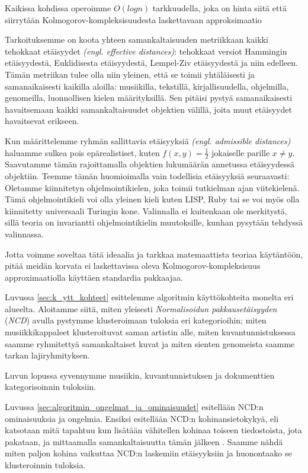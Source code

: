 \documentclass[12pt,finnish,draft]{tktltiki2}
\theoremstyle{definition}
\theoremstyle{remark}
\newcommand{\engl}[1]{\emph{(engl. #1)}}
\begin{document}
  Kaikissa kohdissa  operoimme $O(log n)$ tarkkuudella, joka on hinta siitä että siirrytään Kolmogorov-kompleksisuudesta laskettavaan approksimaatio

  Tarkoituksemme on koota yhteen samankaltaisuuden metriikkaan kaikki tehokkaat etäisyydet \engl{effective distances}: tehokkaat versiot Hammingin etäisyydestä, Euklidisesta etäisyydestä, Lempel-Ziv etäisyydestä ja niin edelleen.
  Tämän metriikan tulee olla niin yleinen, että se toimii yhtäläisesti ja samanaikaisesti kaikilla aloilla: musiikilla, tekstillä, kirjallisuudella, ohjelmilla, genomeilla, luonnollisen kielen määrityksillä.
  Sen pitäisi pystyä samanaikaisesti havaitsemaan kaikki samankaltaisuudet objektien välillä, joita muut etäisyydet havaitsevat erikseen.

  Kun määrittelemme ryhmän sallittavia etäisyyksiä \engl{admissible distances} haluamme sulkea pois epärealistiset, kuten $f(x,y) = \frac{1}{2}$ jokaiselle parille $x \neq y$.
  Saavutamme tämän rajoittamalla objektien lukumäärän annetussa etäisyydessä objektiin.
  Teemme tämän huomioimalla vain todellisia etäisyyksiä seuraavasti: Oletamme kiinnitetyn ohjelmointikielen, joka toimii tutkielman ajan viitekielenä.
  Tämä ohjelmointikieli voi olla yleinen kieli kuten LISP, Ruby tai se voi myös olla kiinnitetty universaali Turingin kone. \cite{CV05,cilibrasi2007google}
  Valinnalla ei kuitenkaan ole merkitystä, sillä teoria on invariantti ohjelmointikielin muutoksille, kunhan pysytään tehdyssä valinnassa.


Jotta voimme soveltaa tätä ideaalia ja tarkkaa matemaattista teoriaa käytäntöön, pitää meidän korvata ei laskettavissa oleva Kolmogorov-kompleksisuus approximaatiolla käyttäen standardia pakkaajaa.

\label{par:intro-3}
  Luvussa \ref{sec:k_ytt_kohteet} esittelemme algoritmin käyttökohteita monelta eri alueelta.
  Aloitamme siitä, miten yleisesti \emph{Normalisoidun pakkausetäisyyden} (\emph{NCD}) avulla pystymme klusteroimaan tuloksia eri kategorioihin; miten musiikkikappaleet klusteroituvat saman artistin alle, miten kuvantunnistuksessa saamme ryhmitettyä samankaltaiset kuvat ja miten sienten genomeista saamme tarkan lajiryhmityksen.


  Luvun lopussa syvennymme musiikin, kuvantunnistuksen ja dokumenttien kategorisoinnin tuloksiin.


\label{par:intro-4}
  Luvussa \ref{sec:algoritmin_ongelmat_ja_ominaisuudet} esitellään NCD:n ominaisuuksia ja ongelmia.
  Ensiksi esitellään NCD:n kohinansietokykyä, eli katsotaan mitä tapahtuu kun lisätään vähitellen kohinaa toiseen tiedostoista, jota pakataan, ja mittaamalla samankaltaisuutta tämän jälkeen \cite{4167725}.
  Saamme nähdä miten paljon kohina vaikuttaa NCD:n laskemiin etäisyyksiin ja huonontaako se klusteroinnin tuloksia.
\end{document}
